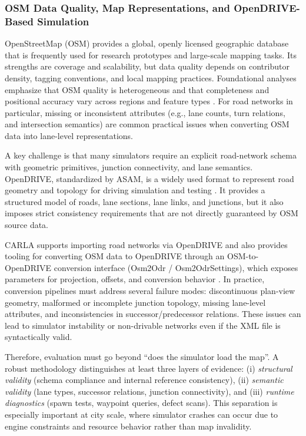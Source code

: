 \subsubsection{OSM Data Quality, Map Representations, and OpenDRIVE-Based Simulation}

OpenStreetMap (OSM) provides a global, openly licensed geographic database that is frequently used for research prototypes and large-scale mapping tasks. Its strengths are coverage and scalability, but data quality depends on contributor density, tagging conventions, and local mapping practices. Foundational analyses emphasize that OSM quality is heterogeneous and that completeness and positional accuracy vary across regions and feature types \cite{haklay2010}. For road networks in particular, missing or inconsistent attributes (e.g., lane counts, turn relations, and intersection semantics) are common practical issues when converting OSM data into lane-level representations.

A key challenge is that many simulators require an explicit road-network schema with geometric primitives, junction connectivity, and lane semantics. OpenDRIVE, standardized by ASAM, is a widely used format to represent road geometry and topology for driving simulation and testing \cite{asam_opendrive}. It provides a structured model of roads, lane sections, lane links, and junctions, but it also imposes strict consistency requirements that are not directly guaranteed by OSM source data.

CARLA supports importing road networks via OpenDRIVE and also provides tooling for converting OSM data to OpenDRIVE through an OSM-to-OpenDRIVE conversion interface (Osm2Odr / Osm2OdrSettings), which exposes parameters for projection, offsets, and conversion behavior \cite{carla_osm2odr_docs}. In practice, conversion pipelines must address several failure modes: discontinuous plan-view geometry, malformed or incomplete junction topology, missing lane-level attributes, and inconsistencies in successor/predecessor relations. These issues can lead to simulator instability or non-drivable networks even if the XML file is syntactically valid.

Therefore, evaluation must go beyond ``does the simulator load the map''. A robust methodology distinguishes at least three layers of evidence:
(i) \emph{structural validity} (schema compliance and internal reference consistency),
(ii) \emph{semantic validity} (lane types, successor relations, junction connectivity), and
(iii) \emph{runtime diagnostics} (spawn tests, waypoint queries, defect scans).
This separation is especially important at city scale, where simulator crashes can occur due to engine constraints and resource behavior rather than map invalidity.

